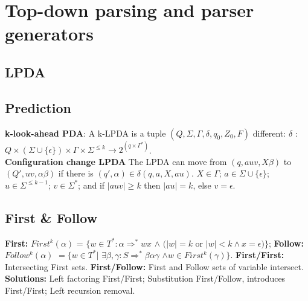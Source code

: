 \section{Top-down parsing and parser generators}
\subsection*{LPDA}
\subsection*{Prediction}
\textbf{k-look-ahead PDA}: A k-LPDA is a tuple $(Q, \Sigma, \Gamma, \delta, q_0, Z_0, F)$ different: $\delta$ : $Q \times (\Sigma \cup \{\epsilon\}) \times \Gamma \times \Sigma^{\leqslant k} \rightarrow 2^{(q\times \Gamma^*)}$.\\
\textbf{Configuration change LPDA}
The LPDA can move from $(q,auv,X\beta)$ to $(Q',uv,\alpha\beta)$ if there is $(q',\alpha) \in \delta (q,a,X,au)$. $X \in \Gamma$; $a \in \Sigma \cup \{\epsilon\}$; $u \in \Sigma^{\leqslant k-1}$; $v \in \Sigma^*$; and if $|auv| \geqslant k$ then $|au| = k$, else $v = \epsilon$.\\
\subsection*{First \& Follow}
\textbf{First:} $First^k(\alpha)$ = $\{w \in T^*: \alpha \Rightarrow^* wx$ $\wedge$ $(|w| = k$ or $|w| < k \wedge x = \epsilon)\}$; \textbf{Follow:} $Follow^k(\alpha)$ $= \{ w \in T^* |$ $\exists \beta, \gamma: S \Rightarrow^* \beta\alpha\gamma$ $\wedge w \in First^k(\gamma)\}$. \textbf{First/First:} Intersecting First sets. \textbf{First/Follow:} First and Follow sets of variable intersect. \textbf{Solutions:} Left factoring First/First; Substitution First/Follow, introduces First/First; Left recursion removal.
